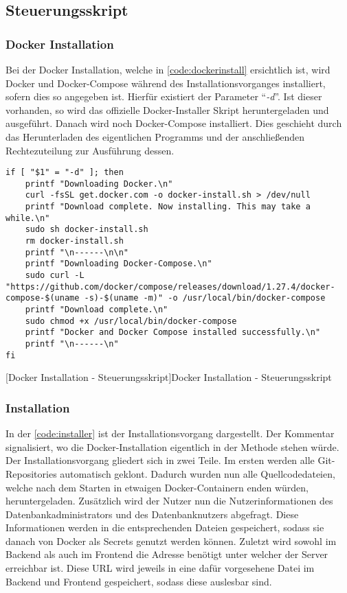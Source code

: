 \subsection{Steuerungsskript}
\subsubsection{Docker Installation}

Bei der Docker Installation, welche in \autoref{code:dockerinstall} ersichtlich ist, wird Docker und Docker-Compose während des Installationsvorganges installiert, sofern dies so angegeben ist. Hierfür existiert der Parameter \enquote{\textit{-d}}. Ist dieser vorhanden, so wird das offizielle Docker-Installer Skript heruntergeladen und ausgeführt. Danach wird noch Docker-Compose installiert. Dies geschieht durch das Herunterladen des eigentlichen Programms und der anschließenden Rechtezuteilung zur Ausführung dessen.

\begin{verbatim}
if [ "$1" = "-d" ]; then
	printf "Downloading Docker.\n"
	curl -fsSL get.docker.com -o docker-install.sh > /dev/null
	printf "Download complete. Now installing. This may take a while.\n"
	sudo sh docker-install.sh
	rm docker-install.sh
	printf "\n------\n\n"
	printf "Downloading Docker-Compose.\n"
	sudo curl -L "https://github.com/docker/compose/releases/download/1.27.4/docker-compose-$(uname -s)-$(uname -m)" -o /usr/local/bin/docker-compose
	printf "Download complete.\n"
	sudo chmod +x /usr/local/bin/docker-compose
	printf "Docker and Docker Compose installed successfully.\n"
	printf "\n------\n"
fi
\end{verbatim}
[Docker Installation - Steuerungsskript]{Docker Installation - Steuerungsskript}
\label{code:dockerinstall}

\subsubsection{Installation}

In der \autoref{code:installer} ist der Installationsvorgang dargestellt. Der Kommentar signalisiert, wo die Docker-Installation eigentlich in der Methode stehen würde. Der Installationsvorgang gliedert sich in zwei Teile. Im ersten werden alle Git-Repositories automatisch geklont. Dadurch wurden nun alle Quellcodedateien, welche nach dem Starten in etwaigen Docker-Containern enden würden, heruntergeladen. Zusätzlich wird der Nutzer nun die Nutzerinformationen des Datenbankadministrators und des Datenbanknutzers abgefragt. Diese Informationen werden in die entsprechenden Dateien gespeichert, sodass sie danach von Docker als Secrets genutzt werden können. Zuletzt wird sowohl im Backend als auch im Frontend die Adresse benötigt unter welcher der Server erreichbar ist. Diese URL wird jeweils in eine dafür vorgesehene Datei im Backend und Frontend gespeichert, sodass diese auslesbar sind.

